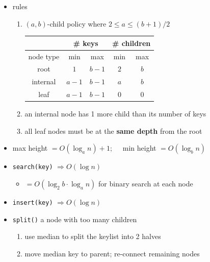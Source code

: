 \documentclass[10pt, landscape]{article}
\let\Then\Rightarrow
\newcommand{\code}[1]{\textcolor{mygreen}{\texttt{#1}}}
\begin{document}
\begin{multicols}{4}
\begin{itemize}
    \item rules
    \begin{enumerate}
        \item $(a, b)$-child policy where $2 \leq a \leq (b+1)/2$
        \begin{tabular}{|c|c|c|c|c|}
            \hline 
             & \multicolumn{2}{c|}{\# keys} & \multicolumn{2}{c|}{\# children}
            \\\hline
            node type & min & max & min & max
            \\\hline
            root & $1$ & $b-1$ & $2$ & $b$
            \\\hline
            internal & $a-1$ & $b-1$ & $a$ & $b$
            \\\hline
            leaf & $a-1$ & $b-1$ & $0$ & $0$
            \\\hline
        \end{tabular}
        \item an internal node has 1 more child than its number of keys
        \item all leaf nodes must be at the \textbf{same depth} from the root
    \end{enumerate}
    \item max height $= O(\log_an) + 1;\quad$ min height $= O(\log_bn)$
    \item \code{search(key)} $\Then O(\log n)$
    \begin{itemize}
        \item $= O(\log_2 b \cdot \log_a n)$ for binary search at each node
    \end{itemize}
    \item \code{insert(key)} $\Then O(\log n)$
    \item \code{split()} a node with too many children
    \begin{enumerate}
        \item use median to split the keylist into 2 halves
        \item move median key to parent; re-connect remaining nodes

\end{enumerate}
\end{itemize}
\end{multicols}
\end{document}
